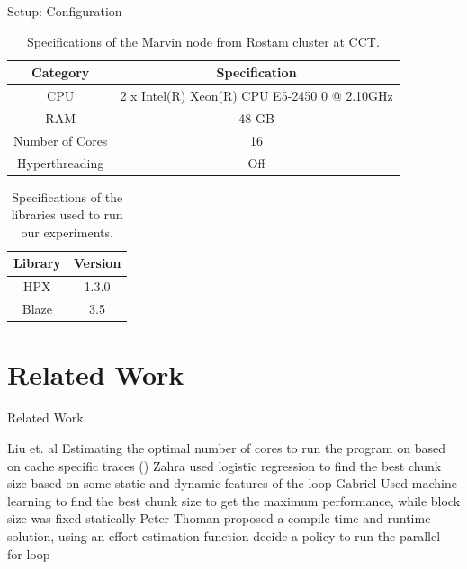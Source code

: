 \documentclass[10pt]{beamer}
\begin{document}
\begin{frame}{Setup: Configuration}
	\begin{outline}
	\vspace{\baselineskip}	
	\begin{table}[H]
		\centering
		\scalebox{0.75}
		{\begin{tabular}{|c | c |} 
				\hline
				
				Category & Specification\\
				\hline
				\hline
				CPU &  2 x Intel(R) Xeon(R) CPU E5-2450 0 @ 2.10GHz \\ [0.5ex] 
				\hline
				RAM & 48 GB\\ 	
				\hline
				Number of Cores & 16\\
				\hline	
				Hyperthreading & Off \\
				\hline			
		\end{tabular}}	
		\caption{Specifications of the Marvin node from Rostam cluster at CCT.}
		\label{table3}
	\end{table} 
\begin{table}[H]
	\centering
	\scalebox{0.75}
	{\begin{tabular}{|c | c |} 
			\hline
			Library & Version \\
			\hline
			\hline
			HPX & 1.3.0 \\ 
			\hline
			Blaze & 3.5\\ 	
			\hline
			
	\end{tabular}}	
	\caption{Specifications of the libraries used to run our experiments.}
	\label{table5}
\end{table}
	\end{outline}
\end{frame}

\section{Related Work}
	\begin{frame}{Related Work}
		\begin{outline}
			\1Liu et. al Estimating the optimal number of cores to run the program on based on cache specific traces (\cite{liu2018runtime})
			\1Zahra used logistic regression to find the best chunk size based on some static and dynamic features of the loop
			\1Gabriel Used machine learning to find the best chunk size to get the maximum performance, while block size was fixed statically
			\1Peter Thoman proposed a compile-time and runtime solution, using an effort estimation function decide a policy to run the parallel for-loop 
		\end{outline}
\end{frame}
\end{document}
